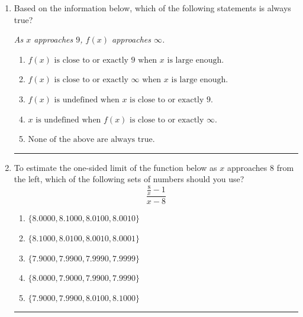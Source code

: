 \documentclass[14pt]{extbook}
\newcommand{\litem}[1]{\item#1\hspace*{-1cm}\rule{\textwidth}{0.4pt}}
\begin{document}
\begin{enumerate}
{\begin{enumerate}[label=\Alph*.]
\end{enumerate} }
\litem{
Based on the information below, which of the following statements is always true?
\begin{center}
    \textit{ As $x$ approaches $9$, $f(x)$ approaches $\infty$. }
\end{center}
\begin{enumerate}[label=\Alph*.]
\item \( f(x) \text{ is close to or exactly } 9 \text{ when } x \text{ is large enough}. \)
\item \( f(x) \text{ is close to or exactly } \infty \text{ when } x \text{ is large enough}. \)
\item \( f(x) \text{ is undefined when } x \text{ is close to or exactly } 9. \)
\item \( x \text{ is undefined when } f(x) \text{ is close to or exactly } \infty. \)
\item \( \text{None of the above are always true.} \)

\end{enumerate} }
\litem{
To estimate the one-sided limit of the function below as $x$ approaches 8 from the left, which of the following sets of numbers should you use?\[ \frac{\frac{8}{x} - 1}{x - 8} \]\begin{enumerate}[label=\Alph*.]
\item \( \{ 8.0000, 8.1000, 8.0100, 8.0010 \} \)
\item \( \{ 8.1000, 8.0100, 8.0010, 8.0001 \} \)
\item \( \{ 7.9000, 7.9900, 7.9990, 7.9999 \} \)
\item \( \{ 8.0000, 7.9000, 7.9900, 7.9990 \} \)
\item \( \{ 7.9000, 7.9900, 8.0100, 8.1000 \} \)

\end{enumerate} }
\end{enumerate}
\end{document}
